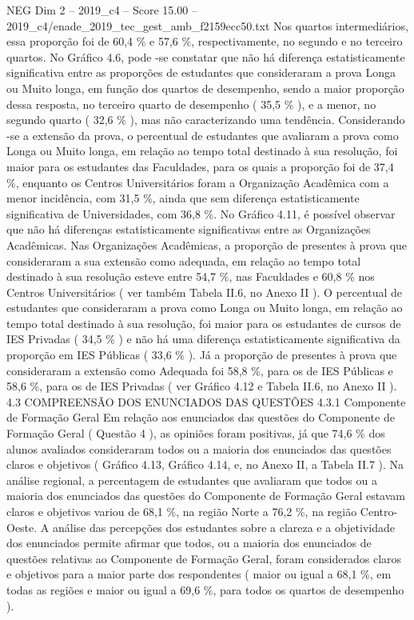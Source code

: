 \begin{textsample}{NEG Dim 2 – 2019\_c4 – Score 15.00 – 2019\_c4/enade\_2019\_tec\_gest\_amb\_f2159ecc50.txt}
Nos quartos intermediários, essa proporção foi de 60,4 \% e 57,6 \%, respectivamente, no segundo e no terceiro quartos.
No Gráfico 4.6, pode -se constatar que não há diferença estatisticamente significativa entre as proporções de estudantes que consideraram a prova Longa ou Muito longa, em função dos quartos de desempenho, sendo a maior proporção dessa resposta, no terceiro quarto de desempenho ( 35,5 \% ), e a menor, no segundo quarto ( 32,6 \% ), mas não caracterizando uma tendência.
Considerando -se a extensão da prova, o percentual de estudantes que avaliaram a prova como Longa ou Muito longa, em relação ao tempo total destinado à sua resolução, foi maior para os estudantes das Faculdades, para os quais a proporção foi de 37,4 \%, enquanto os Centros Universitários foram a Organização Acadêmica com a menor incidência, com 31,5 \%, ainda que sem diferença estatisticamente significativa de Universidades, com 36,8 \%.
No Gráfico 4.11, é possível observar que não há diferenças estatisticamente significativas entre as Organizações Acadêmicas.
Nas Organizações Acadêmicas, a proporção de presentes à prova que consideraram a sua extensão como adequada, em relação ao tempo total destinado à sua resolução esteve entre 54,7 \%, nas Faculdades e 60,8 \% nos Centros Universitários ( ver também Tabela II.6, no Anexo II ).
O percentual de estudantes que consideraram a prova como Longa ou Muito longa, em relação ao tempo total destinado à sua resolução, foi maior para os estudantes de cursos de IES Privadas ( 34,5 \% ) e não há uma diferença estatisticamente significativa da proporção em IES Públicas ( 33,6 \% ).
Já a proporção de presentes à prova que consideraram a extensão como Adequada foi 58,8 \%, para os de IES Públicas e 58,6 \%, para os de IES Privadas ( ver Gráfico 4.12 e Tabela II.6, no Anexo II ). 4.3 COMPREENSÃO DOS ENUNCIADOS DAS QUESTÕES 4.3.1 Componente de Formação Geral Em relação aos enunciados das questões do Componente de Formação Geral ( Questão 4 ), as opiniões foram positivas, já que 74,6 \% dos alunos avaliados consideraram todos ou a maioria dos enunciados das questões claros e objetivos ( Gráfico 4.13, Gráfico 4.14, e, no Anexo II, a Tabela II.7 ).
Na análise regional, a percentagem de estudantes que avaliaram que todos ou a maioria dos enunciados das questões do Componente de Formação Geral estavam claros e objetivos variou de 68,1 \%, na região Norte a 76,2 \%, na região Centro-Oeste.
A análise das percepções dos estudantes sobre a clareza e a objetividade dos enunciados permite afirmar que todos, ou a maioria dos enunciados de questões relativas ao Componente de Formação Geral, foram considerados claros e objetivos para a maior parte dos respondentes ( maior ou igual a 68,1 \%, em todas as regiões e maior ou igual a 69,6 \%, para todos os quartos de desempenho ).

\end{textsample}
